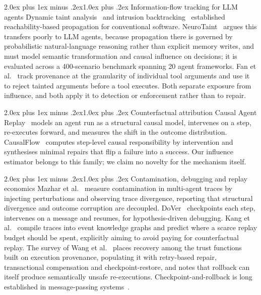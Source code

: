 \documentclass[10pt,twocolumn,a4paper]{article}
\makeatletter
\renewcommand{\subsection}{\@startsection{subsection}{2}{\z@}%
  {2.0ex plus 1ex minus .2ex}{1.0ex plus .2ex}%
  {\normalfont\normalsize\itshape}}
\makeatother
\begin{document}
\subsection{Information-flow tracking for LLM agents}
Dynamic taint analysis~\cite{newsome2005} and intrusion
backtracking~\cite{king2003} established reachability-based propagation for
conventional software. NeuroTaint~\cite{neurotaint2026} argues this transfers
poorly to LLM agents, because propagation there is governed by probabilistic
natural-language reasoning rather than explicit memory writes, and must model
semantic transformation and causal influence on decisions; it is evaluated
across a 400-scenario benchmark spanning 20 agent frameworks. Fan et
al.~\cite{granularity2026} track provenance at the granularity of individual
tool arguments and use it to reject tainted arguments before a tool executes.
Both separate exposure from influence, and both apply it to
detection or enforcement rather than to repair.

\subsection{Counterfactual attribution}
Causal Agent Replay~\cite{car2026} models an agent run as a structural causal
model, intervenes on a step, re-executes forward, and measures the shift in the
outcome distribution. CausalFlow~\cite{causalflow2026} computes step-level
causal responsibility by intervention and synthesises minimal repairs that flip
a failure into a success. Our influence estimator belongs to this family; we
claim no novelty for the mechanism itself.

\subsection{Contamination, debugging and replay economics}
Mazhar et al.~\cite{tracelevel2026} measure contamination in multi-agent traces
by injecting perturbations and observing trace divergence, reporting that
structural divergence and outcome corruption are decoupled.
DoVer~\cite{dover2026} checkpoints each step, intervenes on a message and
resumes, for hypothesis-driven debugging. Kang et al.~\cite{zeroreplay2026}
compile traces into event knowledge graphs and predict where a scarce replay
budget should be spent, explicitly aiming to avoid paying for counterfactual
replay. The survey of Wang et al.~\cite{trustsurvey2026} places recovery among
the trust functions built on execution provenance, populating it with
retry-based repair, transactional compensation and checkpoint-restore, and notes
that rollback can itself produce semantically unsafe re-executions.
Checkpoint-and-rollback is long established in message-passing
systems~\cite{elnozahy2002}.
\end{document}
